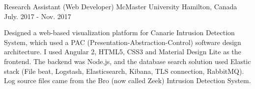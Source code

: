 \begin{cventries}
  \cventry
{} %
{} %
{} %
{} %
	{
}



  \cventry
{Research Assistant (Web Developer)} %
{McMaster University} %
{Hamilton, Canada} %
{July. 2017 - Nov. 2017} %
{\begin{cvitems}
		\item
		{Designed a web-based visualization platform for Canarie Intrusion Detection System, which used a PAC (Presentation-Abstraction-Control) software design architecture. I used Angular 2, HTML5, CSS3 and Material Design Lite as the frontend. The backend was Node.js, and the database search solution used Elastic stack (File beat, Logstash, Elasticsearch, Kibana, TLS connection, RabbitMQ). Log source files came from the Bro (now called Zeek) Intrusion Detection System.}
	\end{cvitems}
}


\end{cventries}
